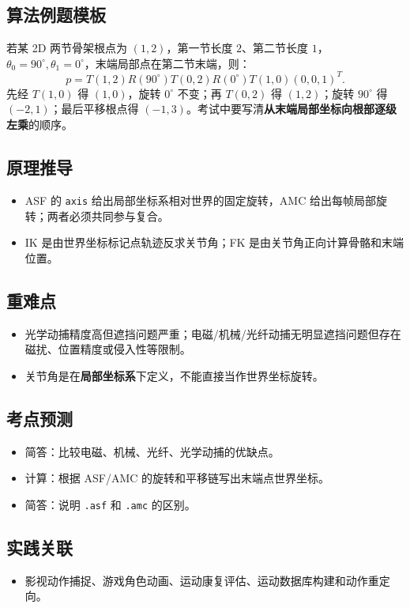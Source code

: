 \documentclass[UTF8,zihao=-4,scheme=chinese,fontset=fandol]{ctexart}
\newcommand{\key}[1]{\textbf{#1}}
\begin{document}
\subsection{算法例题模板}
若某 2D 两节骨架根点为 $(1,2)$，第一节长度 $2$、第二节长度 $1$，$\theta_0=90^\circ,\theta_1=0^\circ$，末端局部点在第二节末端，则：
\[
p=T(1,2)R(90^\circ)T(0,2)R(0^\circ)T(1,0)(0,0,1)^T.
\]
先经 $T(1,0)$ 得 $(1,0)$，旋转 $0^\circ$ 不变；再 $T(0,2)$ 得 $(1,2)$；旋转 $90^\circ$ 得 $(-2,1)$；最后平移根点得 $(-1,3)$。考试中要写清\key{从末端局部坐标向根部逐级左乘}的顺序。

\subsection{原理推导}
\begin{itemize}
  \item ASF 的 \texttt{axis} 给出局部坐标系相对世界的固定旋转，AMC 给出每帧局部旋转；两者必须共同参与复合。
  \item IK 是由世界坐标标记点轨迹反求关节角；FK 是由关节角正向计算骨骼和末端位置。
\end{itemize}

\subsection{重难点}
\begin{itemize}
  \item 光学动捕精度高但遮挡问题严重；电磁/机械/光纤动捕无明显遮挡问题但存在磁扰、位置精度或侵入性等限制。
  \item 关节角是在\key{局部坐标系}下定义，不能直接当作世界坐标旋转。
\end{itemize}

\subsection{考点预测}
\begin{itemize}
  \item 简答：比较电磁、机械、光纤、光学动捕的优缺点。
  \item 计算：根据 ASF/AMC 的旋转和平移链写出末端点世界坐标。
  \item 简答：说明 \texttt{.asf} 和 \texttt{.amc} 的区别。
\end{itemize}

\subsection{实践关联}
\begin{itemize}
  \item 影视动作捕捉、游戏角色动画、运动康复评估、运动数据库构建和动作重定向。
\end{itemize}
\end{document}
